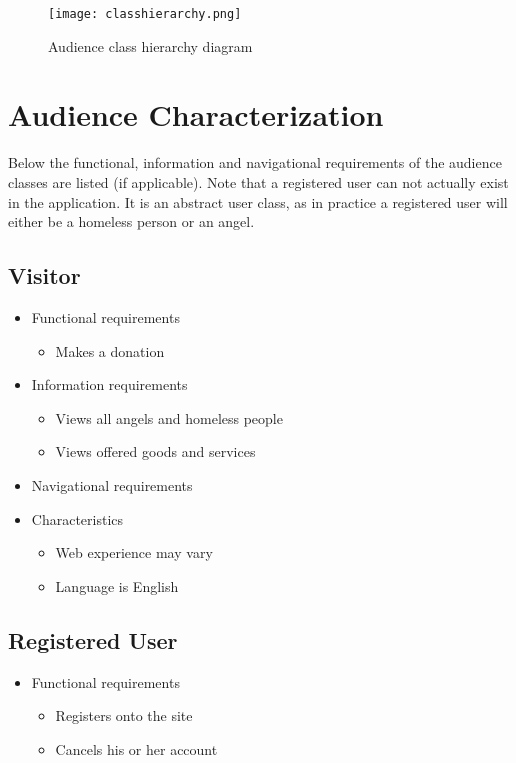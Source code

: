 \documentclass[a4paper]{report}
\begin{document}
\begin{figure}[htp]
\centering
\texttt{[image: classhierarchy.png]}
\caption{Audience class hierarchy diagram}
\label{fig:classhierarchy}
\end{figure}

\section{Audience Characterization}
Below the functional, information and navigational requirements of the audience classes are listed (if applicable). Note that a registered user can not actually exist in the application. It is an abstract user class, as in practice a registered user will either be a homeless person or an angel.

\subsection{Visitor}
\begin{itemize}
	\item Functional requirements
	\begin{itemize}
		\item Makes a donation
	\end{itemize}
	\item Information requirements
	\begin{itemize}
		\item Views all angels and homeless people
		\item Views offered goods and services
	\end{itemize}
	\item Navigational requirements
	\item Characteristics
	\begin{itemize}
		\item Web experience may vary
		\item Language is English
	\end{itemize}
\end{itemize}

\subsection{Registered User}
\begin{itemize}
	\item Functional requirements
	\begin{itemize}
		\item Registers onto the site
		\item Cancels his or her account
	\end{itemize}
\end{itemize}
\end{document}
